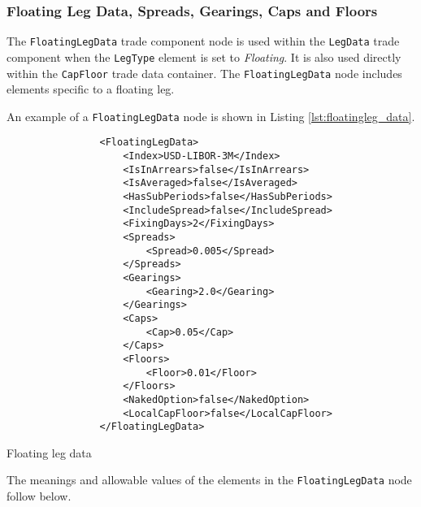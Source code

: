 \subsubsection{Floating Leg Data, Spreads, Gearings, Caps and Floors}
\label{ss:floatingleg_data}

The \lstinline!FloatingLegData! trade component node is used within the \lstinline!LegData! trade component when the
\lstinline!LegType! element is set to \emph{Floating}. It is also used directly within the \lstinline!CapFloor! trade
data container.  The \lstinline!FloatingLegData! node includes elements specific to a floating leg.

An example of a \lstinline!FloatingLegData! node is shown in Listing \ref{lst:floatingleg_data}.
\begin{listing}[H]
\begin{verbatim}
                <FloatingLegData>
                    <Index>USD-LIBOR-3M</Index>
                    <IsInArrears>false</IsInArrears>
                    <IsAveraged>false</IsAveraged>
                    <HasSubPeriods>false</HasSubPeriods>
                    <IncludeSpread>false</IncludeSpread>
                    <FixingDays>2</FixingDays>
                    <Spreads>
                        <Spread>0.005</Spread>
                    </Spreads>
                    <Gearings>
                        <Gearing>2.0</Gearing>
                    </Gearings>
                    <Caps>
                        <Cap>0.05</Cap>
                    </Caps>
                    <Floors>
                        <Floor>0.01</Floor>
                    </Floors>
                    <NakedOption>false</NakedOption>
                    <LocalCapFloor>false</LocalCapFloor>
                </FloatingLegData>
\end{verbatim}
\caption{Floating leg data}
\label{lst:floatingleg_data}
\end{listing}

The meanings and allowable values of the elements in the \lstinline!FloatingLegData! node follow below.

